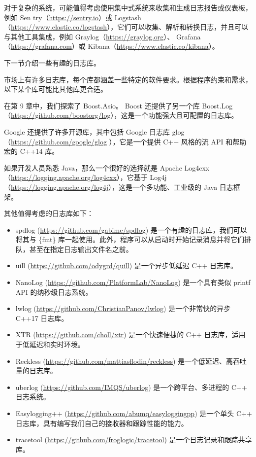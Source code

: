 对于复杂的系统，可能值得考虑使用集中式系统来收集和生成日志报告或仪表板，例如 Sen try（\url{https://sentry.io}）或 Logstash（\url{https://www.elastic.co/logstash}），它们可以收集、解析和转换日志，并且可以与其他工具集成，例如 Graylog（\url{https://graylog.org}）、 Grafana（\url{https://grafana.com}）或 Kibana（\url{https://www.elastic.co/kibana}）。

下一节介绍一些有趣的日志库。


市场上有许多日志库，每个库都涵盖一些特定的软件要求。根据程序约束和需求，以下某个库可能比其他库更合适。

在第 9 章中，我们探索了 Boost.Asio。 Boost 还提供了另一个库 Boost.Log（\url{https://github.com/boostorg/log}），这是一个功能强大且可配置的日志库。

Google 还提供了许多开源库，其中包括 Google 日志库 glog（\url{https://github.com/google/glog} ），它是一个提供 C++ 风格的流 API 和帮助宏的 C++14 库。

如果开发人员熟悉 Java，那么一个很好的选择就是 Apache Log4cxx（\url{https://logging.apache.org/log4cxx}），它基于 Log4j（\url{https://logging.apache.org/log4j}），这是一个多功能、工业级的 Java 日志框架。

其他值得考虑的日志库如下：

\begin{itemize}
\item
spdlog (\url{https://github.com/gabime/spdlog}) 是一个有趣的日志库，我们可以将其与 \{fmt\} 库一起使用。此外，程序可以从启动时开始记录消息并将它们排队，甚至在指定日志输出文件名之前。

\item
uill (\url{https://github.com/odygrd/quill}) 是一个异步低延迟 C++ 日志库。

\item
NanoLog (\url{https://github.com/PlatformLab/NanoLog}) 是一个具有类似 printf API 的纳秒级日志系统。

\item
lwlog (\url{https://github.com/ChristianPanov/lwlog}) 是一个非常快的异步 C++17 日志库。

\item
XTR (\url{https://github.com/choll/xtr}) 是一个快速便捷的 C++ 日志库，适用于低延迟和实时环境。

\item
Reckless (\url{https://github.com/mattiasflodin/reckless}) 是一个低延迟、高吞吐量的日志库。

\item
uberlog (\url{https://github.com/IMQS/uberlog}) 是一个跨平台、多进程的 C++ 日志系统。

\item
Easylogging++ (\url{https://github.com/abumq/easyloggingpp}) 是一个单头 C++ 日志库，具有编写我们自己的接收器和跟踪性能的能力。

\item
tracetool (\url{https://github.com/froglogic/tracetool}) 是一个日志记录和跟踪共享库。
\end{itemize}

